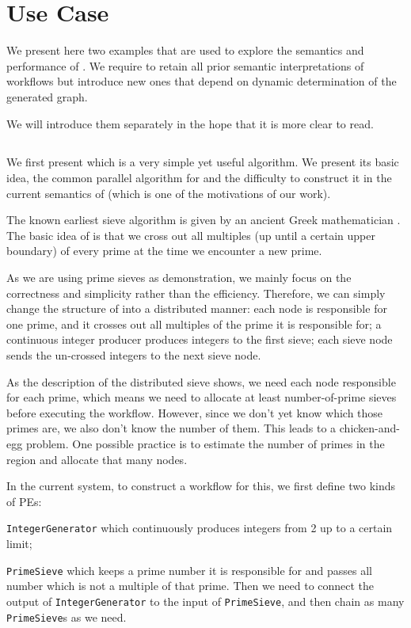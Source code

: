 \chapter{Use Case}
We present here two examples that are used to explore the semantics and performance of \dpy. We require to retain all prior semantic interpretations of workflows but introduce new ones that depend on dynamic determination of the generated graph.

We will introduce them separately in the hope that it is more clear to read.

\section{\tSieve}
We first present \ttsieve which is a very simple yet useful algorithm. We present its basic idea, the common parallel algorithm for \ttsieve and the difficulty to construct it in the current semantics of \dpy (which is one of the motivations of our work).

The known earliest sieve algorithm is \ttesieve given by an ancient Greek mathematician \cite{o2009genuine}. The basic idea of \ttesieve is that we cross out all multiples (up until a certain upper boundary) of every prime at the time we encounter a new prime.

As we are using prime sieves as demonstration, we mainly focus on the correctness and simplicity rather than the efficiency. Therefore, we can simply change the structure of \ttesieve into a distributed manner: each node is responsible for one prime, and it crosses out all multiples of the prime it is responsible for; a continuous integer producer produces integers to the first sieve; each sieve node sends the un-crossed integers to the next sieve node.

As the description of the distributed sieve shows, we need each node responsible for each prime, which means we need to allocate at least number-of-prime sieves before executing the workflow. However, since we don't yet know which those primes are, we also don't know the number of them. This leads to a chicken-and-egg problem. One possible practice is to estimate the number of primes in the region and allocate that many nodes.

\newcommand{\cdIntGen}{\lstinline|IntegerGenerator|\xspace}
\newcommand{\cdSieve}{\lstinline|PrimeSieve|\xspace}

In the current \dpy system, to construct a workflow for this, we first define two kinds of PEs:
\begin{enumerate*}
	\item \cdIntGen which continuously produces integers from 2 up to a certain limit;
	\item \cdSieve which keeps a prime number it is responsible for and passes all number which is not a multiple of that prime. Then we need to connect the output of \cdIntGen to the input of \cdSieve , and then chain as many \cdSieve{}s as we need.
\end{enumerate*}

